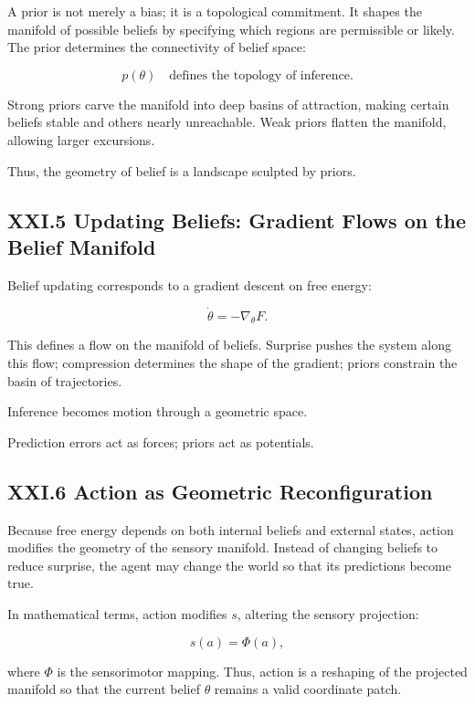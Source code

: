 \documentclass[11pt,letterpaper]{article}
\begin{document}
A prior is not merely a bias; it is a topological commitment. It shapes the manifold of possible beliefs by specifying which regions are permissible or likely. The prior determines the connectivity of belief space:

\[
p(\theta) \quad \text{defines the topology of inference.}
\]

Strong priors carve the manifold into deep basins of attraction, making certain beliefs stable and others nearly unreachable. Weak priors flatten the manifold, allowing larger excursions.

Thus, the geometry of belief is a landscape sculpted by priors.

\subsection{XXI.5 Updating Beliefs: Gradient Flows on the Belief Manifold}

Belief updating corresponds to a gradient descent on free energy:

\[
\dot{\theta} = -\nabla_\theta F.
\]

This defines a flow on the manifold of beliefs. Surprise pushes the system along this flow; compression determines the shape of the gradient; priors constrain the basin of trajectories.

Inference becomes motion through a geometric space.

Prediction errors act as forces; priors act as potentials.

\subsection{XXI.6 Action as Geometric Reconfiguration}

Because free energy depends on both internal beliefs and external states, action modifies the geometry of the sensory manifold. Instead of changing beliefs to reduce surprise, the agent may change the world so that its predictions become true.

In mathematical terms, action modifies \(s\), altering the sensory projection:

\[
s(a) = \Phi(a),
\]

where \(\Phi\) is the sensorimotor mapping. Thus, action is a reshaping of the projected manifold so that the current belief \(\theta\) remains a valid coordinate patch.
\end{document}
